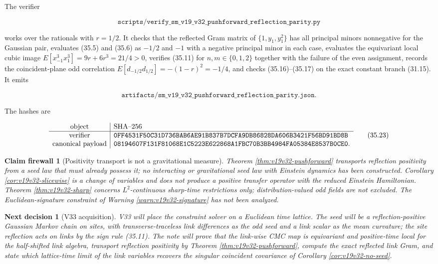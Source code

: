 \documentclass[11pt]{article}
\newtheorem{firewall}[theorem]{Claim firewall}
\newtheorem{decision}[theorem]{Next decision}
\theoremstyle{remark}
\begin{document}
The verifier

\[
 \texttt{scripts/verify\_sm\_v19\_v32\_pushforward\_reflection\_parity.py}
                                                                    \tag{35.21}
\]

works over the rationals with \(r=1/2\).  It checks that the reflected
Gram matrix of \(\{1,y_1,y_1^2\}\) has all principal minors nonnegative
for the Gaussian pair, evaluates (35.5) and (35.6) as \(-1/2\) and
\(-1\) with a negative principal minor in each case, evaluates the
equivariant local cubic image \(E[x_{-1}^3x_1^3]=9r+6r^3=21/4>0\),
verifies (35.11) for \(n,m\in\{0,1,2\}\) together with the failure of the
even assignment, records the coincident-plane odd correlation
\(E[d_{-1/2}d_{1/2}]=-(1-r)^2=-1/4\), and checks (35.16)--(35.17) on the
exact constant branch (31.15).  It emits

\[
 \texttt{artifacts/sm\_v19\_v32\_pushforward\_reflection\_parity.json}.
                                                                    \tag{35.22}
\]

The hashes are

\[
\begin{array}{c|l}
\hbox{object}&\hbox{SHA--256}\\ \hline
\hbox{verifier}&
\texttt{0FF4531F50C31D736BAB6AE91B837B7DCFA9DB86828DA606B3421F56BD91BD8B}\\
\hbox{canonical payload}&
\texttt{08194607F131F81068E1C5223E622868A1FBC70B3BB4984FA05384E8537B0CE0}.
\end{array}                                                     \tag{35.23}
\]

\begin{firewall}[Positivity transport is not a gravitational measure]
\label{fire:v19v32}
Theorem \ref{thm:v19v32-pushforward} transports reflection positivity
from a seed law that must already possess it; no interacting or
gravitational seed law with Einstein dynamics has been constructed.
Corollary \ref{cor:v19v32-slicewise} is a change of variables and does
not produce a positive transfer operator with the reduced Einstein
Hamiltonian.  Theorem \ref{thm:v19v32-sharp} concerns \(L^2\)-continuous
sharp-time restrictions only; distribution-valued odd fields are not
excluded.  The Euclidean-signature constraint of Warning
\ref{warn:v19v32-signature} has not been analyzed.
\end{firewall}

\begin{decision}[V33 acquisition]
\label{dec:v19v32-next}
V33 will place the constraint solver on a Euclidean time lattice.  The
seed will be a reflection-positive Gaussian Markov chain on sites, with
transverse-traceless link differences as the odd seed and a link scalar
as the mean curvature; the site reflection acts on links by the sign
rule (35.11).  The note will prove that the link-wise CMC map is
equivariant and positive-time local for the half-shifted link algebra,
transport reflection positivity by Theorem
\ref{thm:v19v32-pushforward}, compute the exact reflected link Gram, and
state which lattice-time limit of the link variables recovers the
singular coincident covariance of Corollary \ref{cor:v19v32-no-seed}.
\end{decision}
\end{document}
